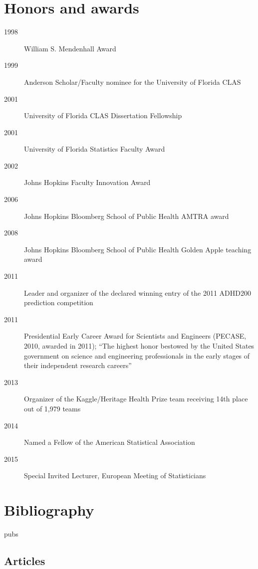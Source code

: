 \documentclass[12pt]{article}
\begin{document}
\section*{Honors and awards}
\begin{description}
\item[\textnormal{1998}] William S. Mendenhall Award
\item[\textnormal{1999}] Anderson Scholar/Faculty nominee for the University of  Florida CLAS
\item[\textnormal{2001}] University of Florida CLAS Dissertation Fellowship
\item[\textnormal{2001}] University of Florida Statistics Faculty Award
\item[\textnormal{2002}] Johns Hopkins Faculty Innovation Award
\item[\textnormal{2006}] Johns Hopkins Bloomberg School of Public Health AMTRA award
\item[\textnormal{2008}] Johns Hopkins Bloomberg School of Public Health Golden Apple teaching award
\item[\textnormal{2011}] Leader and organizer of the declared winning entry of the 2011 ADHD200 prediction competition
\item[\textnormal{2011}] Presidential Early Career Award for
  Scientists and Engineers (PECASE, 2010, awarded in 2011); ``The highest honor bestowed by the
  United States government on science and engineering professionals in
  the early stages of their independent research careers''
\item[\textnormal{2013}] Organizer of the Kaggle/Heritage Health Prize team receiving 14th place out of 1,979 teams
\item[\textnormal{2014}] Named a Fellow of the American Statistical Association
\item[\textnormal{2015}] Special Invited Lecturer, European Meeting of Statisticians
\end{description}

%


\section*{Bibliography}
\begin{btSect}{pubs}
\subsection*{Articles}
\btPrintNotCited
\end{btSect}
\end{document}
